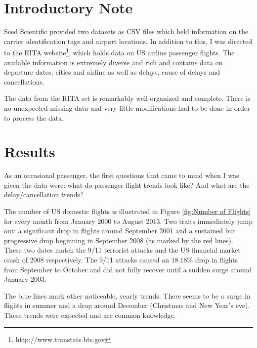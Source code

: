 \documentclass[11pt,twoside,titlepage]{article}
\begin{document}
\section{Introductory Note}

Seed Scientific provided two datasets as CSV files which held information on the carrier identification tags and airport locations. In addition to this, I was directed to the RITA website\footnote{http://www.transtats.bts.gov}, which holds data on US airline passenger flights. The available information is extremely diverse and rich and contains data on departure dates, cities and airline as well as delays, cause of delays and cancellations.

The data from the RITA set is remarkably well organized and complete. There is no unexpected missing data and very little modifications had to be done in order to process the data.

\section{Results}

As an occasional passenger, the first questions that came to mind when I was given the data were: what do passenger flight trends look like? And what are the delay/cancellation trends? 

The number of US domestic flights is illustrated in Figure \ref{fig:Number of Flights} for every month from January 2000 to August 2013. Two traits immediately jump out: a significant drop in flights around September 2001 and a sustained but progressive drop beginning in September 2008 (as marked by the red lines). These two dates match the 9/11 terrorist attacks and the US financial market crash of 2008 respectively. The 9/11 attacks caused an $18.18\%$ drop in flights from September to October and did not fully recover until a sudden surge around January 2003.

The blue lines mark other noticeable, yearly trends. There seems to be a surge in flights in summer and a drop around December (Christmas and New Year's eve). These trends were expected and are common knowledge.
\end{document}
